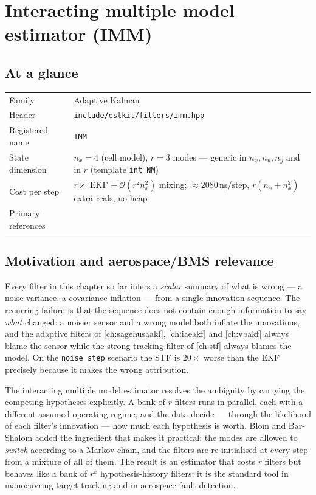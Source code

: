 \chapter{Interacting multiple model estimator (IMM)}
\label{ch:imm}

\section*{At a glance}
\begin{tabular}{@{}l>{\raggedright\arraybackslash}p{}@{}}
Family & Adaptive Kalman \\
Header & \texttt{include/estkit/filters/imm.hpp} \\
Registered name & \texttt{IMM} \\
State dimension & $n_x = 4$ (cell model), $r = 3$ modes --- generic in $n_x,n_u,n_y$ and in $r$ (template \texttt{int NM}) \\
Cost per step & $r\times$ EKF $+\ \mathcal{O}(r^2 n_x^2)$ mixing; $\approx 2080$\,ns/step, $r(n_x+n_x^2)$ extra reals, no heap \\
Primary references & \cite{blom1988imm,barshalom2001,lijilkov2005mm,magill1965mmae,jazwinski1970} \\
\end{tabular}

\section{Motivation and aerospace/BMS relevance}
Every filter in this chapter so far infers a \emph{scalar} summary of what is wrong --- a noise
variance, a covariance inflation --- from a single innovation sequence.  The recurring failure is
that the sequence does not contain enough information to say \emph{what} changed: a noisier sensor
and a wrong model both inflate the innovations, and the adaptive filters of
\cref{ch:sagehusaakf}, \cref{ch:iaeakf} and \cref{ch:vbakf} always blame the sensor while the strong tracking filter of
\cref{ch:stf} always blames the model.  On the \texttt{noise\_step} scenario the STF is $20\times$
worse than the EKF precisely because it makes the wrong attribution.

The interacting multiple model estimator resolves the ambiguity by carrying the competing
hypotheses explicitly.  A bank of $r$ filters runs in parallel, each with a different assumed
operating regime, and the data decide --- through the likelihood of each filter's innovation --- how
much each hypothesis is worth.  Blom and Bar-Shalom \cite{blom1988imm} added the ingredient that
makes it practical: the modes are allowed to \emph{switch} according to a Markov chain, and the
filters are re-initialised at every step from a mixture of all of them.  The result is an estimator
that costs $r$ filters but behaves like a bank of $r^k$ hypothesis-history filters; it is the
standard tool in manoeuvring-target tracking \cite[Sec.~11.6]{barshalom2001}\cite{lijilkov2005mm}
and in aerospace fault detection.

